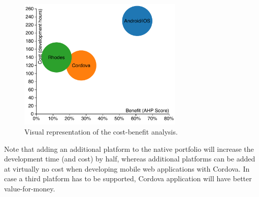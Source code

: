 \begin{figure}
    \begin{center}
        \includegraphics[width=0.7\textwidth]{figs/benefit-cost.pdf}
        \caption{Visual representation of the cost-benefit analysis.}
        \label{fig:cost-benefit}
    \end{center}
\end{figure}

Note that adding an additional platform to the native portfolio will increase the development time (and cost) by half, whereas additional platforms can be added at virtually no cost when developing mobile web applications with Cordova. In case a third platform has to be supported, Cordova application will have better value-for-money.
